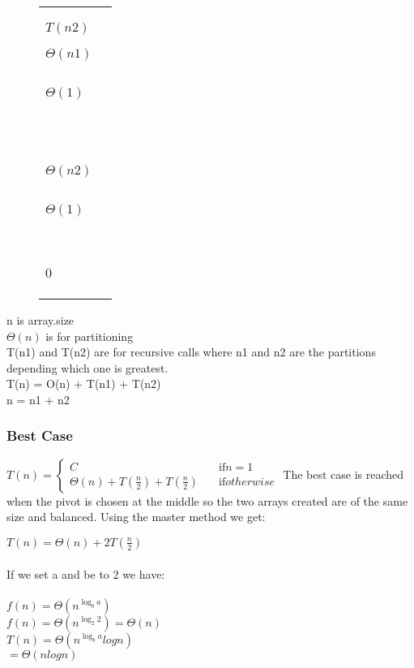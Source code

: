 \documentclass{article}
\begin{document}
\begin{center}
\begin{figure}[H]
\begin{tabular}{|p{}|p{}|}
    $T(n2)$

    $\Theta(n1)$

    $ $


    $\Theta(1)$

    $ $

    $ $

    $ $

    $ $

    $\Theta(n2)$

    $ $


    $\Theta(1)$

    $ $

    $ $

    $ $

    $0$
    \\
\\
\hline
\end{tabular}
\end{figure}
\end{center}
n is array.size\\
$\Theta(n)$ is for partitioning\\
T(n1) and T(n2) are for recursive calls where n1 and n2 are the partitions depending which one is greatest.\\
T(n) = O(n) + T(n1) + T(n2)\\
n = n1 + n2\\
\subsubsection{Best Case}
$ T(n) =
  \begin{cases}
    C       & \quad \mathrm{if  } n =1\\

    \Theta(n) + T(\frac{n}{2}) +   T(\frac{n}{2}) & \quad \mathrm{if } otherwise
  \end{cases}
$
\newline
The best case is reached when the pivot is chosen at the middle so the two arrays created are of the same size and balanced. Using the master method we get:

$T(n) = \Theta(n) + 2T(\frac{n}{2})$ \\\\
If we set a and be to 2 we have:\\\\
$f(n) = \Theta(n^{\log_b a})$ \\
$f(n) = \Theta(n^{\log_2 2})=\Theta(n)$ \\
$T(n) = \Theta(n^{\log_b a}logn)$ \\
		 $= \Theta(nlogn)$ \\ \\
\end{document}
